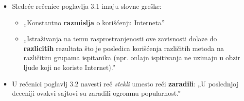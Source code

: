 \documentclass[a4paper]{report}
\begin{document}
\begin{itemize}
    \item  Sledeće rečenice poglavlja 3.1 imaju slovne greške:
    \begin{itemize}
        \item „Konstantno \textbf{razmislja} o korišćenju Interneta”
    \end{itemize}
    \begin{itemize}
        \item „Istraživanja na temu rasprostranjenosti ove zavisnosti dolaze do 
        \textbf{razlicitih} rezultata što je posledica korišćenja različitih metoda na različitim grupama ispitanika (npr. onlajn ispitivanja ne uzimaju u obzir ljude koji ne koriste Internet).”
    \end{itemize}
\end{itemize}
\begin{itemize}
    \item U rečenici poglavlj 3.2 navesti reč \textit{stekli} umesto reči \textbf{zaradili}: \newline
    „U poslednjoj deceniji ovakvi sajtovi su zaradili ogromnu popularnost.”
\end{itemize}
\end{document}

